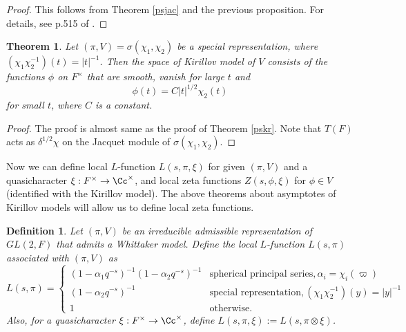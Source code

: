 \documentclass{article}
\newtheorem{theorem}{Theorem}[section]
\newtheorem{definition}{Definition}[section]
\begin{document}
\begin{proof}
This follows from Theorem \ref{psjac} and the previous proposition. For details, see p.515 of \cite{bu}. 
\end{proof}
\begin{theorem}
\label{spkr}
Let $(\pi, V) = \sigma(\chi_1, \chi_2)$ be a special representation, where $(\chi_1\chi_2^{-1})(t) = |t|^{-1}$.  Then the space of Kirillov model of $V$ consists of the functions $\phi$ on $F^{\times}$ that are smooth, vanish for large $t$ and $$\phi(t) = C|t|^{1/2}\chi_{2}(t)$$ for small $t$, where $C$ is a constant. 
\end{theorem}
\begin{proof}
The proof is almost same as the proof of Theorem \ref{pskr}. Note that $T(F)$ acts as $\delta^{1/2}\chi$ on the Jacquet module of $\sigma(\chi_1, \chi_2)$. 
\end{proof}

Now we can define local $L$-function $L(s, \pi, \xi)$ for given $(\pi, V)$ and a quasicharacter $\xi:F^\times \to\Cc^{\times}$, and local zeta functions $Z(s, \phi, \xi)$ for $\phi\in V$ (identified with the Kirillov model). 
The above theorems about asymptotes of Kirillov models will allow us to define local zeta functions. 
\begin{definition}
Let $(\pi, V)$ be an irreducible admissible representation of $GL(2, F)$ that admits a Whittaker model.
Define the local $L$-function $L(s, \pi)$ associated with $(\pi, V)$ as
$$
L(s, \pi) = \begin{cases} (1-\alpha_1 q^{-s})^{-1}(1-\alpha_2 q^{-s})^{-1} & \text{spherical principal series}, \alpha_i = \chi_i(\varpi) \\
(1-\alpha_{2} q^{-s})^{-1} & \text{special representation}, (\chi_{1}\chi_{2}^{-1})(y) = |y|^{-1} \\
1 &  \text{otherwise.}\end{cases}
$$
Also, for a quasicharacter $\xi:F^{\times} \to \Cc^{\times}$, define $L(s, \pi, \xi):= L(s, \pi\otimes \xi)$. 
\end{definition}
\end{document}
